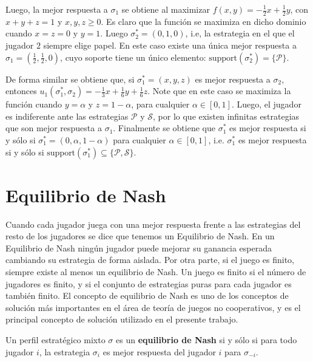 Luego, la mejor respuesta a $\sigma_1$ se obtiene al maximizar $f(x, y) = -\frac{1}{2}x + \frac{1}{2}y$, con $x+y+z =1$ y $x, y, z \geq 0$. Es claro que la función se maximiza en dicho dominio cuando $x = z = 0$ y $y = 1$. Luego $\sigma^*_2 = (0, 1, 0)$, i.e, la estrategia en el que el jugador $2$ siempre elige papel. En este caso existe una única mejor respuesta a $\sigma_1 = \left(\frac{1}{2}, \frac{1}{2}, 0\right)$, cuyo soporte tiene un único elemento: $\text{support}(\sigma^*_2) = \{\mathcal{P}\}$.

De forma similar se obtiene que, si $\sigma^*_1 = (x, y, z)$ es mejor respuesta a $\sigma_2$, entonces $u_1(\sigma^*_1, \sigma_2) = -\frac{1}{3}x + \frac{1}{6}y + \frac{1}{6}z$. Note que en este caso se maximiza la función cuando $y = \alpha$ y $z = 1 -\alpha$, para cualquier $\alpha \in [0, 1]$. Luego, el jugador es indiferente ante las estrategias $\mathcal{P}$ y $\mathcal{S}$, por lo que existen infinitas estrategias que son mejor respuesta a $\sigma_1$. Finalmente se obtiene que $\sigma^*_1$ es mejor respuesta si y sólo si $\sigma^*_1 = (0, \alpha, 1 - \alpha)$ para cualquier  $\alpha \in [0, 1]$, i.e. $\sigma^*_1$ es mejor respuesta si y sólo si $\text{support}(\sigma^*_1) \subseteq \{\mathcal{P}, \mathcal{S} \}$.

\section{Equilibrio de Nash}
Cuando cada jugador juega con una mejor respuesta frente a las estrategias del resto de los jugadores se dice que tenemos un Equilibrio de Nash. En un Equilibrio de Nash ningún jugador puede mejorar su ganancia esperada cambiando su estrategia de forma aislada. Por otra parte, si el juego es finito, siempre existe al menos un equilibrio de Nash. Un juego es finito si el número de jugadores es finito, y si el conjunto de estrategias puras para cada jugador es también finito. El concepto de equilibrio de Nash es uno de los conceptos de solución más importantes en el área de teoría de juegos no cooperativos, y es el principal concepto de solución utilizado en el presente trabajo.

\begin{definition}
\label{def:equilibrio-nash} Un perfil estratégico mixto $\sigma$ es un \textbf{equilibrio de Nash} si y s\'olo si para todo jugador $i$, la estrategia $\sigma_i$ es mejor respuesta del jugador $i$ para $\sigma_{-i}$.
\end{definition}

